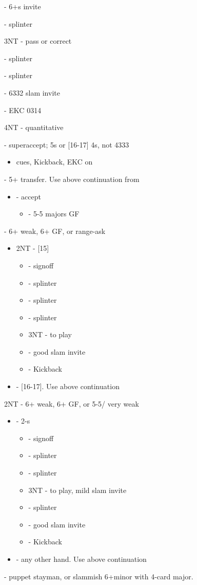 \documentclass[12pt]{report}
\newcommand{\ul}[1]{\begin{itemize}#1\end{itemize}}
\newcommand{\li}{\item[~]}
\begin{document}
{{{                \li {} - 6+\he{}s invite
                \li {} - splinter
                \li 3NT - pass or correct
                \li {} - splinter
                \li {} - splinter
                \li {} - 6332 slam invite
                \li {} - EKC 0314
                \li 4NT - quantitative
            }
            \li {} - superaccept; 5\he{}s or [16-17] 4\he{}s, not 4333
            \ul {
                \li cues, Kickback, EKC on
            }
        }

        \li {} - 5+\sp{} transfer. Use above continuation from 
        \ul {
            \li {} - accept
            \ul {
                \li \he3 - 5-5 majors GF
            }
        }

        \li {} - 6+\cl{} weak, 6+\cl{} GF, or range-ask
        \ul {
            \li 2NT - [15]
            \ul {
                \li \cl3 - signoff
                \li \di3 - splinter
                \li \he3 - splinter
                \li \sp3 - splinter
                \li 3NT - to play
                \li \cl4 - good slam invite
                \li \di4 - Kickback
            }
            \li \cl3 - [16-17]. Use above continuation
        }

        \li 2NT - 6+\di{} weak, 6+\di{} GF, or 5-5\cl{}/\di{} very weak
        \ul {
            \li {} - 2-\di{}s
            \ul {
                \li \di3 - signoff
                \li \he3 - splinter
                \li \sp3 - splinter
                \li 3NT - to play, mild slam invite
                \li \cl4 - splinter
                \li \di4 - good slam invite
                \li \he4 - Kickback
            }
            \li \di3 - any other hand. Use above continuation
        }

        \li {} - puppet stayman, or slammish 6+minor with 4-card major.

}
\end{document}
